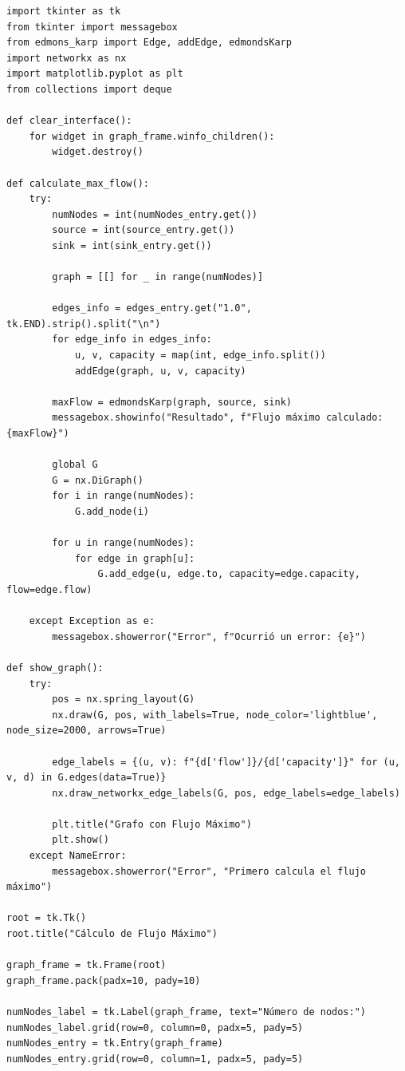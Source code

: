 \documentclass[a4paper]{article}
\begin{document}
\begin{lstlisting}[style=mystyle, caption={Código de la implemntación de la interfaz gráfica}, label={lst:edmonds-karp}]
import tkinter as tk
from tkinter import messagebox
from edmons_karp import Edge, addEdge, edmondsKarp
import networkx as nx
import matplotlib.pyplot as plt
from collections import deque

def clear_interface():
    for widget in graph_frame.winfo_children():
        widget.destroy()

def calculate_max_flow():
    try:
        numNodes = int(numNodes_entry.get())
        source = int(source_entry.get())
        sink = int(sink_entry.get())

        graph = [[] for _ in range(numNodes)]

        edges_info = edges_entry.get("1.0", tk.END).strip().split("\n")
        for edge_info in edges_info:
            u, v, capacity = map(int, edge_info.split())
            addEdge(graph, u, v, capacity)

        maxFlow = edmondsKarp(graph, source, sink)
        messagebox.showinfo("Resultado", f"Flujo máximo calculado: {maxFlow}")

        global G
        G = nx.DiGraph()
        for i in range(numNodes):
            G.add_node(i)

        for u in range(numNodes):
            for edge in graph[u]:
                G.add_edge(u, edge.to, capacity=edge.capacity, flow=edge.flow)

    except Exception as e:
        messagebox.showerror("Error", f"Ocurrió un error: {e}")

def show_graph():
    try:
        pos = nx.spring_layout(G)
        nx.draw(G, pos, with_labels=True, node_color='lightblue', node_size=2000, arrows=True)

        edge_labels = {(u, v): f"{d['flow']}/{d['capacity']}" for (u, v, d) in G.edges(data=True)}
        nx.draw_networkx_edge_labels(G, pos, edge_labels=edge_labels)

        plt.title("Grafo con Flujo Máximo")
        plt.show()
    except NameError:
        messagebox.showerror("Error", "Primero calcula el flujo máximo")

root = tk.Tk()
root.title("Cálculo de Flujo Máximo")

graph_frame = tk.Frame(root)
graph_frame.pack(padx=10, pady=10)

numNodes_label = tk.Label(graph_frame, text="Número de nodos:")
numNodes_label.grid(row=0, column=0, padx=5, pady=5)
numNodes_entry = tk.Entry(graph_frame)
numNodes_entry.grid(row=0, column=1, padx=5, pady=5)


\end{lstlisting}
\end{document}

